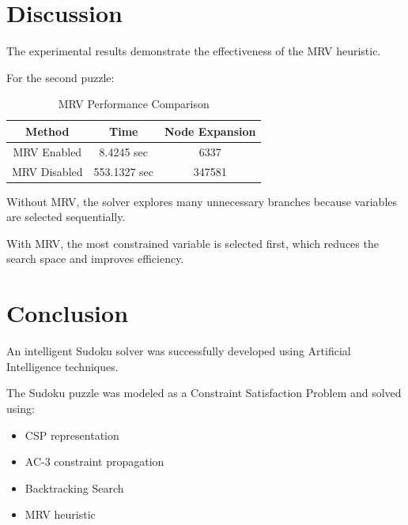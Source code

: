 \documentclass[12pt,a4paper]{article}
\begin{document}

\section{Discussion}


The experimental results demonstrate the effectiveness of the MRV heuristic.


For the second puzzle:


\begin{table}[H]

\centering

\begin{tabular}{ccc}

\toprule

Method & Time & Node Expansion \\

\midrule

MRV Enabled & 8.4245 sec & 6337 \\

MRV Disabled & 553.1327 sec & 347581 \\


\bottomrule

\end{tabular}


\caption{MRV Performance Comparison}

\end{table}



Without MRV, the solver explores many unnecessary branches because variables
are selected sequentially.


With MRV, the most constrained variable is selected first, which reduces the
search space and improves efficiency.




\section{Conclusion}


An intelligent Sudoku solver was successfully developed using Artificial
Intelligence techniques.


The Sudoku puzzle was modeled as a Constraint Satisfaction Problem and solved
using:


\begin{itemize}

\item CSP representation

\item AC-3 constraint propagation

\item Backtracking Search

\item MRV heuristic

\end{itemize}
\end{document}
